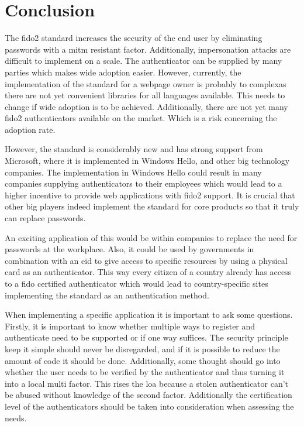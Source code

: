 \documentclass[a4paper, 11pt]{scrartcl}
\begin{document}
\section{Conclusion}
The \gls{fido2} standard increases the security of the end user by eliminating passwords with a \gls{mitm} resistant factor. Additionally, impersonation attacks are difficult to implement on a scale. The authenticator can be supplied by many parties which makes wide adoption easier. However, currently, the implementation of the standard for a webpage owner is probably to complexas there are not yet convenient libraries for all languages available. This needs to change if wide adoption is to be achieved. Additionally, there are not yet many \gls{fido2} authenticators available on the market. Which is a risk concerning the adoption rate.

However, the standard is considerably new and has strong support from Microsoft, where it is implemented in Windows Hello, and other big technology companies. The implementation in Windows Hello could result in many companies supplying authenticators to their employees which would lead to a higher incentive to provide web applications with \gls{fido2} support. It is crucial that other big players indeed implement the standard for core products so that it truly can replace passwords.

An exciting application of this would be within companies to replace the need for passwords at the workplace. Also, it could be used by governments in combination with an \gls{eid} to give access to specific resources by using a physical card as an authenticator. This way every citizen of a country already has access to a \gls{fido} certified authenticator which would lead to country-specific sites implementing the standard as an authentication method. 

When implementing a specific application it is important to ask some questions. Firstly, it is important to know whether multiple ways to register and authenticate need to be supported or if one way suffices. The security principle keep it simple should never be disregarded, and if it is possible to reduce the amount of code it should be done. Additionally, some thought should go into whether the user needs to be verified by the authenticator and thus turning it into a local multi factor. This rises the \gls{loa} because a stolen authenticator can't be abused without knowledge of the second factor. Additionally the certification level of the authenticators should be taken into consideration when assessing the needs.
\end{document}
